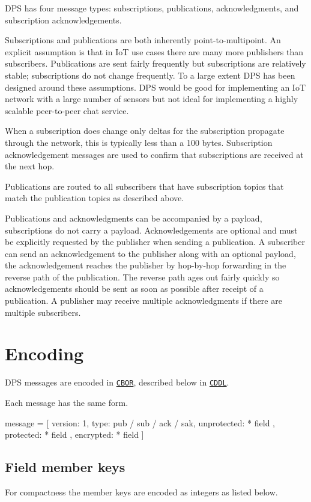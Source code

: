D\+PS has four message types\+: subscriptions, publications, acknowledgments, and subscription acknowledgements.

Subscriptions and publications are both inherently point-\/to-\/multipoint. An explicit assumption is that in IoT use cases there are many more publishers than subscribers. Publications are sent fairly frequently but subscriptions are relatively stable; subscriptions do not change frequently. To a large extent D\+PS has been designed around these assumptions. D\+PS would be good for implementing an IoT network with a large number of sensors but not ideal for implementing a highly scalable peer-\/to-\/peer chat service.

When a subscription does change only deltas for the subscription propagate through the network, this is typically less than a 100 bytes. Subscription acknowledgement messages are used to confirm that subscriptions are received at the next hop.

Publications are routed to all subscribers that have subscription topics that match the publication topics as described above.

Publications and acknowledgments can be accompanied by a payload, subscriptions do not carry a payload. Acknowledgements are optional and must be explicitly requested by the publisher when sending a publication. A subscriber can send an acknowledgement to the publisher along with an optional payload, the acknowledgement reaches the publisher by hop-\/by-\/hop forwarding in the reverse path of the publication. The reverse path ages out fairly quickly so acknowledgements should be sent as soon as possible after receipt of a publication. A publisher may receive multiple acknowledgments if there are multiple subscribers.\hypertarget{message-types-and-flow_message-encoding}{}\section{Encoding}\label{message-types-and-flow_message-encoding}
D\+PS messages are encoded in \href{https://tools.ietf.org/html/rfc7049}{\tt C\+B\+OR}, described below in \href{https://tools.ietf.org/html/draft-ietf-cbor-cddl-00}{\tt C\+D\+DL}.

Each message has the same form.

\begin{DoxyVerb}message = [
  version: 1,
  type: pub / sub / ack / sak,
  unprotected: { * field },
  protected: { * field },
  encrypted: { * field }
]
\end{DoxyVerb}
\hypertarget{message-types-and-flow_field-member-keys}{}\subsection{Field member keys}\label{message-types-and-flow_field-member-keys}
For compactness the member keys are encoded as integers as listed below.

